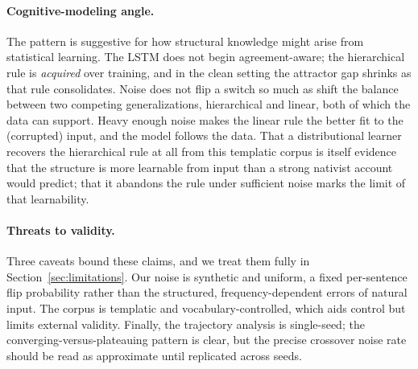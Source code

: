 \paragraph{Cognitive-modeling angle.}
The pattern is suggestive for how structural knowledge might arise from
statistical learning. The LSTM does not begin agreement-aware; the hierarchical
rule is \emph{acquired} over training, and in the clean setting the attractor
gap shrinks as that rule consolidates. Noise does not flip a switch so much as
shift the balance between two competing generalizations, hierarchical and
linear, both of which the data can support. Heavy enough noise makes the linear
rule the better fit to the (corrupted) input, and the model follows the data.
That a distributional learner recovers the hierarchical rule at all from this
templatic corpus is itself evidence that the structure is more learnable from
input than a strong nativist account would predict; that it abandons the rule
under sufficient noise marks the limit of that learnability.

\paragraph{Threats to validity.}
Three caveats bound these claims, and we treat them fully in
Section~\ref{sec:limitations}. Our noise is synthetic and uniform, a fixed
per-sentence flip probability rather than the structured, frequency-dependent
errors of natural input. The corpus is templatic and vocabulary-controlled,
which aids control but limits external validity. Finally, the trajectory
analysis is single-seed; the converging-versus-plateauing pattern is clear, but
the precise crossover noise rate should be read as approximate until replicated
across seeds.

